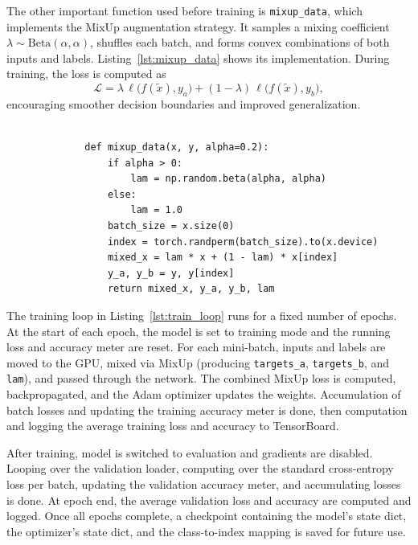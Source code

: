 The other important function used before training is \texttt{mixup\_data}, which implements the MixUp augmentation strategy. It samples a mixing coefficient $\lambda \sim \mathrm{Beta}(\alpha,\alpha)$, shuffles each batch, and forms convex combinations of both inputs and labels. Listing~\ref{lst:mixup_data} shows its implementation. During training, the loss is computed as  
\[
\mathcal{L}
= \lambda\,\ell\bigl(f(\widetilde x),y_a\bigr)
+ (1-\lambda)\,\ell\bigl(f(\widetilde x),y_b\bigr),
\]
encouraging smoother decision boundaries and improved generalization.
\begin{figure}[htbp]
  \centering
  \begin{minipage}{\linewidth}
    \begin{lstlisting}[style=pythonstyle, caption={MixUp data augmentation function}, label=lst:mixup_data]

        def mixup_data(x, y, alpha=0.2):
            if alpha > 0:
                lam = np.random.beta(alpha, alpha)
            else:
                lam = 1.0
            batch_size = x.size(0)
            index = torch.randperm(batch_size).to(x.device)
            mixed_x = lam * x + (1 - lam) * x[index]
            y_a, y_b = y, y[index]
            return mixed_x, y_a, y_b, lam
    \end{lstlisting}
  \end{minipage}
\end{figure}

The training loop in Listing~\ref{lst:train_loop} runs for a fixed number of epochs. At the start of each epoch, the model is set to training mode and the running loss and accuracy meter are reset. For each mini-batch, inputs and labels are moved to the GPU, mixed via MixUp (producing \texttt{targets\_a}, \texttt{targets\_b}, and \texttt{lam}), and passed through the network. The combined MixUp loss is computed, backpropagated, and the Adam optimizer updates the weights. Accumulation of batch losses and updating the training accuracy meter is done, then computation and logging the average training loss and accuracy to TensorBoard.

After training, model is switched to evaluation and gradients are disabled. Looping over the validation loader, computing over the standard cross-entropy loss per batch, updating the validation accuracy meter, and accumulating losses is done. At epoch end, the average validation loss and accuracy are computed and logged. Once all epochs complete, a checkpoint containing the model's state dict, the optimizer's state dict, and the class-to-index mapping is saved for future use.  
    
